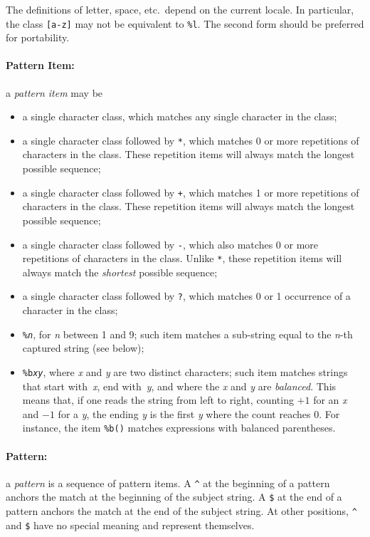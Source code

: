 \documentclass[11pt,twoside,draft]{article}
\newcommand{\M}[1]{{\rm\emph{#1}}}
\newcommand{\T}[1]{{\tt #1}}
\newcommand{\Math}[1]{$#1$}
\newcommand{\Def}[1]{\emph{#1}\index{#1}}
\begin{document}
The definitions of letter, space, etc.\ depend on the current locale.
In particular, the class \verb|[a-z]| may not be equivalent to \verb|%l|.
The second form should be preferred for portability.

\paragraph{Pattern Item:}
a \Def{pattern item} may be
\begin{itemize}
\item
a single character class,
which matches any single character in the class;
\item
a single character class followed by \verb|*|,
which matches 0 or more repetitions of characters in the class.
These repetition items will always match the longest possible sequence;
\item
a single character class followed by \verb|+|,
which matches 1 or more repetitions of characters in the class.
These repetition items will always match the longest possible sequence;
\item
a single character class followed by \verb|-|,
which also matches 0 or more repetitions of characters in the class.
Unlike \verb|*|,
these repetition items will always match the \emph{shortest} possible sequence;
\item
a single character class followed by \verb|?|,
which matches 0 or 1 occurrence of a character in the class;
\item
\T{\%\M{n}}, for \M{n} between 1 and 9;
such item matches a sub-string equal to the \M{n}-th captured string
(see below);
\item
\T{\%b\M{xy}}, where \M{x} and \M{y} are two distinct characters;
such item matches strings that start with~\M{x}, end with~\M{y},
and where the \M{x} and \M{y} are \emph{balanced}.
This means that, if one reads the string from left to right,
counting \Math{+1} for an \M{x} and \Math{-1} for a \M{y},
the ending \M{y} is the first \M{y} where the count reaches 0.
For instance, the item \verb|%b()| matches expressions with
balanced parentheses.
\end{itemize}

\paragraph{Pattern:}
a \Def{pattern} is a sequence of pattern items.
A \verb|^| at the beginning of a pattern anchors the match at the
beginning of the subject string.
A \verb|$| at the end of a pattern anchors the match at the
end of the subject string.
At other positions,
\verb|^| and \verb|$| have no special meaning and represent themselves.
\end{document}
